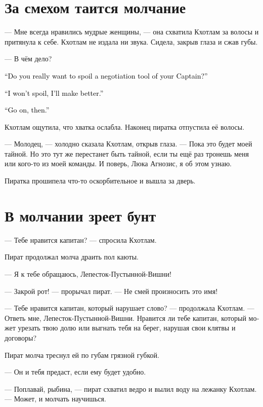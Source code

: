 \documentclass[a4paper,12pt,fleqn]{book}\usepackage{cooltooltips}\usepackage{polyglossia}\setdefaultlanguage{russian}\setotherlanguage{english}\defaultfontfeatures{Ligatures=TeX,Mapping=tex-text} \usepackage{xcolor}\definecolor{lightgray}{HTML}{bbbbbb}\color{lightgray}\newcommand{\ml}[3]{\textenglish{\textcolor{black}{#3}}}
\newcommand{\asterism}{\vspace{1em}{\centering\Large\bfseries$\ast~\ast~\ast$\par}\vspace{1em}}
\begin{document}
\section{За смехом таится молчание}

--- Мне всегда нравились мудрые женщины, --- она схватила Кхотлам за волосы и притянула к себе.
Кхотлам не издала ни звука.
Сидела, закрыв глаза и сжав губы.

--- В чём дело?

\ml{$0$}
{--- Ты действительно хочешь испортить инструмент переговоров твоего капитана?}
{``Do you really want to spoil a negotiation tool of your Captain?''}

\ml{$0$}
{--- Я не испорчу, я сделаю лучше.}
{``I won't spoil, I'll make better.''}

\ml{$0$}
{--- Тогда продолжай.}
{``Go on, then.''}

Кхотлам ощутила, что хватка ослабла.
Наконец пиратка отпустила её волосы.

--- Молодец, --- холодно сказала Кхотлам, открыв глаза.
--- Пока это будет моей тайной.
Но это тут же перестанет быть тайной, если ты ещё раз тронешь меня или кого-то из моей команды.
И поверь, Люка Агнозис, я об этом узнаю.

Пиратка прошипела что-то оскорбительное и вышла за дверь.

\section{В молчании зреет бунт}

--- Тебе нравится капитан? --- спросила Кхотлам.

Пират продолжал молча драить пол каюты.

--- Я к тебе обращаюсь, Лепесток-Пустынной-Вишни!

--- Закрой рот! --- прорычал пират.
--- Не смей произносить это имя!

--- Тебе нравится капитан, который нарушает слово? --- продолжала Кхотлам.
--- Ответь мне, Лепесток-Пустынной-Вишни.
Нравится ли тебе капитан, который может урезать твою долю или выгнать тебя на берег, нарушая свои клятвы и договоры?

Пират молча треснул ей по губам грязной губкой.

--- Он и тебя предаст, если ему будет удобно.

--- Поплавай, рыбина, --- пират схватил ведро и вылил воду на лежанку Кхотлам.
--- Может, и молчать научишься.

\asterism
\end{document}
